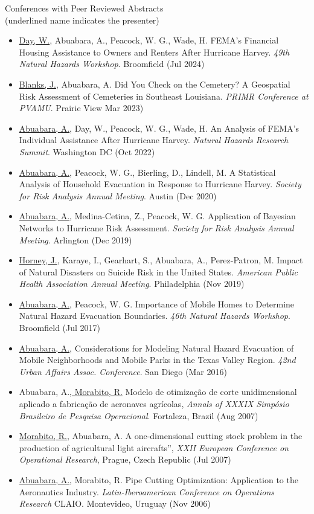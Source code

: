 \documentclass[11pt,oneside]{article}
\begin{document}
{Conferences with Peer Reviewed Abstracts}\\{\small (underlined name indicates the presenter)}
\begin{itemize}[leftmargin=20pt]
\item \underline{Day, W.}, Abuabara, A., Peacock, W. G., Wade, H. FEMA's Financial Housing Assistance to Owners and Renters After Hurricane Harvey. \emph{49th Natural Hazards Workshop}. Broomfield (Jul 2024)
\item \underline{Blanks, J.}, Abuabara, A. Did You Check on the Cemetery? A Geospatial Risk Assessment of Cemeteries in Southeast Louisiana. \emph{PRIMR Conference at PVAMU}. Prairie View Mar 2023)
\item \underline{Abuabara, A.}, Day, W., Peacock, W. G., Wade, H. An Analysis of FEMA's Individual Assistance After Hurricane Harvey. \emph{Natural Hazards Research Summit}. Washington DC (Oct 2022)
\item \underline{Abuabara, A.}, Peacock, W. G., Bierling, D., Lindell, M. A Statistical Analysis of Household Evacuation in Response to Hurricane Harvey. \emph{Society for Risk Analysis Annual Meeting}. Austin (Dec 2020)
\item \underline{Abuabara, A.}, Medina-Cetina, Z., Peacock, W. G. Application of Bayesian Networks to Hurricane Risk Assessment. \emph{Society for Risk Analysis Annual Meeting}. Arlington (Dec 2019)
\item \underline{Horney, J.}, Karaye, I., Gearhart, S., Abuabara, A., Perez-Patron, M. Impact of Natural Disasters on Suicide Risk in the United States. \emph{American Public Health Association Annual Meeting}. Philadelphia (Nov 2019)
\item \underline{Abuabara, A.}, Peacock, W. G. Importance of Mobile Homes to Determine Natural Hazard Evacuation Boundaries. \emph{46th Natural Hazards Workshop}. Broomfield (Jul 2017)
\item \underline{Abuabara, A.}, Considerations for Modeling Natural Hazard Evacuation of Mobile Neighborhoods and Mobile Parks in the Texas Valley Region. \emph{42nd Urban Affairs Assoc. Conference}. San Diego (Mar 2016)
\item Abuabara, A.,\underline{ Morabito, R.} Modelo de otimização de corte unidimensional aplicado a fabricação de aeronaves agrícolas, \emph{Annals of XXXIX Simpósio Brasileiro de Pesquisa Operacional}. Fortaleza, Brazil (Aug 2007)
\item \underline{Morabito, R.}, Abuabara, A. A one-dimensional cutting stock problem in the production of agricultural light aircrafts”, \emph{XXII European Conference on Operational Research}, Prague, Czech Republic (Jul 2007)
\item \underline{Abuabara, A.}, Morabito, R. Pipe Cutting Optimization: Application to the Aeronautics Industry. \emph{Latin-Iberoamerican Conference on Operations Research} CLAIO. Montevideo, Uruguay (Nov 2006)
\end{itemize}
\end{document}
